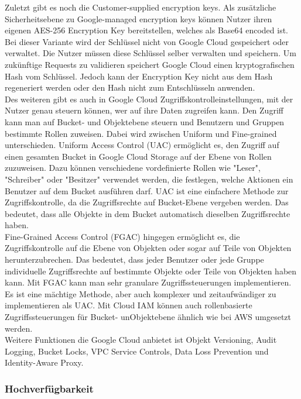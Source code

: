 Zuletzt gibt es noch die Customer-supplied encryption keys. Als zusätzliche Sicherheitsebene zu Google-managed encryption keys können Nutzer ihren eigenen AES-256 Encryption Key bereitstellen, welches als Base64 encoded ist. Bei dieser Variante wird der Schlüssel nicht von Google Cloud gespeichert oder verwaltet. Die Nutzer müssen diese Schlüssel selber verwalten und speichern. Um zukünftige Requests zu validieren speichert Google Cloud einen kryptografischen Hash vom Schlüssel. Jedoch kann der Encryption Key nicht aus dem Hash regeneriert werden oder den Hash nicht zum Entschlüsseln anwenden.\\

Des weiteren gibt es auch in Google Cloud Zugriffskontrolleinstellungen, mit der Nutzer genau steuern können, wer auf ihre Daten zugreifen kann. Den Zugriff kann man auf Bucket- und Objektebene steuern und Benutzern und Gruppen bestimmte Rollen zuweisen. Dabei wird zwischen Uniform und Fine-grained unterschieden. Uniform Access Control (UAC) ermöglicht es, den Zugriff auf einen gesamten Bucket in Google Cloud Storage auf der Ebene von Rollen zuzuweisen. Dazu können verschiedene vordefinierte Rollen wie "Leser", "Schreiber" oder "Besitzer" verwendet werden, die festlegen, welche Aktionen ein Benutzer auf dem Bucket ausführen darf. UAC ist eine einfachere Methode zur Zugriffskontrolle, da die Zugriffsrechte auf Bucket-Ebene vergeben werden. Das bedeutet, dass alle Objekte in dem Bucket automatisch dieselben Zugriffsrechte haben.\\

Fine-Grained Access Control (FGAC) hingegen ermöglicht es, die Zugriffskontrolle auf die Ebene von Objekten oder sogar auf Teile von Objekten herunterzubrechen. Das bedeutet, dass jeder Benutzer oder jede Gruppe individuelle Zugriffsrechte auf bestimmte Objekte oder Teile von Objekten haben kann. Mit FGAC kann man sehr granulare Zugriffssteuerungen implementieren. Es ist eine mächtige Methode, aber auch komplexer und zeitaufwändiger zu implementieren als UAC. Mit Cloud IAM können auch rollenbasierte Zugriffssteuerungen für Bucket- unObjektebene ähnlich wie bei AWS umgesetzt werden.\\

Weitere Funktionen die Google Cloud anbietet ist Objekt Versioning, Audit Logging, Bucket Locks, VPC Service Controls, Data Loss Prevention und Identity-Aware Proxy.


\subsubsection{Hochverfügbarkeit}

